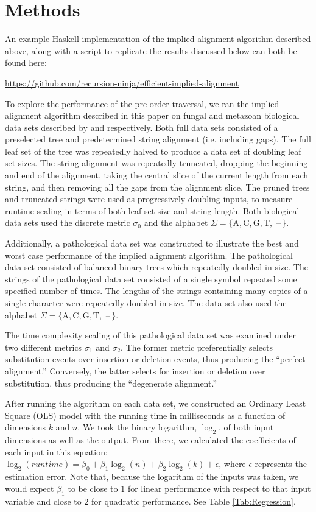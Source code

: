 \documentclass{bmcart}
\begin{document}
\section*{Methods}

An example Haskell implementation of the implied alignment algorithm described above, along with a script to replicate the results discussed below can both be found here: 

\centerline{\url{https://github.com/recursion-ninja/efficient-implied-alignment}}

To explore the performance of the pre-order traversal, we ran the implied alignment algorithm described in this paper on fungal and metazoan biological data sets described by \cite{GiribetandWheeler1999} and \cite{GiribetandWheeler2001} respectively.
Both full data sets consisted of a preselected tree and predetermined string alignment (i.e. including gaps).
The full leaf set of the tree was repeatedly halved to produce a data set of doubling leaf set sizes.
The string alignment was repeatedly truncated, dropping the beginning and end of the alignment, taking the central slice of the current length from each string, and then removing all the gaps from the alignment slice.
The pruned trees and truncated strings were used as progressively doubling inputs, to measure runtime scaling in terms of both leaf set size and string length.
Both biological data sets used the discrete metric $\sigma_0$ and the alphabet $\Sigma = \{\mathrm{A, C, G, T,}$ --$\,\}$.

Additionally, a pathological data set was constructed to illustrate the best and worst case performance of the implied alignment algorithm.
The pathological data set consisted of balanced binary trees which repeatedly doubled in size.
The strings of the pathological data set consisted of a single symbol repeated some specified number of times.
The lengths of the strings containing many copies of a single character were repeatedly doubled in size.
The data set also used the alphabet $\Sigma = \{\mathrm{A, C, G, T,}$ --$\,\}$.

The time complexity scaling of this pathological data set was examined under two different metrics $\sigma_1$ and $\sigma_2$.
The former metric preferentially selects substitution events over insertion or deletion events, thus producing the ``perfect alignment.''
Conversely, the latter selects for insertion or deletion over substitution, thus producing the ``degenerate alignment.''


After running the algorithm on each data set, we constructed an Ordinary Least Square (OLS) model with the running time in milliseconds as a function of dimensions $k$ and $n$.
We took the binary logarithm, $\log_{2}$, of both input dimensions as well as the output.
From there, we calculated the coefficients of each input in this equation: $\log_2(runtime) = \beta_0 + \beta_1 \log_2(n) + \beta_2 \log_2(k) + \epsilon$, where $\epsilon$ represents the estimation error.
Note that, because the logarithm of the inputs was taken, we would expect $\beta_1$ to be close to $1$ for linear performance with respect to that input variable and close to $2$ for quadratic performance.
See Table \ref{Tab:Regression}.
\end{document}
